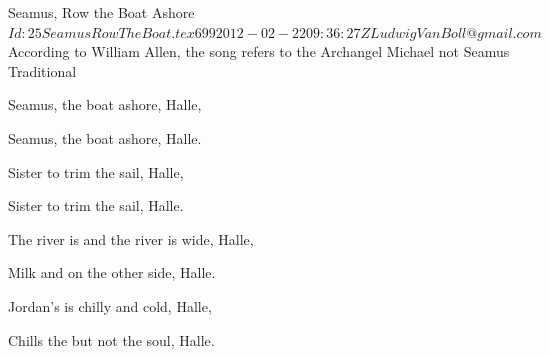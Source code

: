 \begin{SBSong}{Seamus, Row the Boat Ashore}
  {$Id: 25SeamusRowTheBoat.tex 699 2012-02-22 09:36:27Z LudwigVanBoll@gmail.com $}
  {According to William Allen, the song refers to the Archangel Michael not Seamus}
  {Traditional}
  \begin{SBChorus}
    Seamus,  the boat ashore, Halle,
    
    Seamus,  the boat ashore, Halle. 
  \end{SBChorus}
  \begin{SBVerse}
    Sister  to trim the sail, Halle,
    
    Sister  to trim the sail, Halle. 
  \end{SBVerse}
  \begin{SBVerse}
    The river is  and the river is wide, Halle,
    
    Milk and  on the other side, Halle. 
  \end{SBVerse}
  \begin{SBVerse}
    Jordan's  is chilly and cold, Halle,
    
    Chills the  but not the soul, Halle. 
  \end{SBVerse}
\end{SBSong}